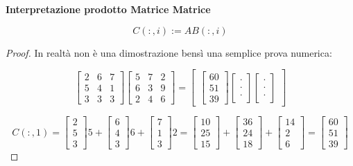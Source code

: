 \begin{thrm}{\textbf{Interpretazione prodotto Matrice Matrice}}

\[
	C(:,i) := AB(:,i)
\]

\end{thrm}

\begin{proof}

In realtà non è una dimostrazione bensì una semplice prova numerica:

\[
	\begin{bmatrix}2&6&7\\5&4&1\\3&3&3\end{bmatrix}\begin{bmatrix}5&7&2\\6&3&9\\2&4&6\end{bmatrix} = \begin{bmatrix}\begin{bmatrix}60\\51\\39\end{bmatrix}\begin{bmatrix}\mathord{\cdot}\\\mathord{\cdot}\\\mathord{\cdot}\end{bmatrix}\begin{bmatrix}\mathord{\cdot}\\\mathord{\cdot}\\\mathord{\cdot}\end{bmatrix}\end{bmatrix}
\]

\[
	C(:,1) = \begin{bmatrix}2\\5\\3\end{bmatrix}5+\begin{bmatrix}6\\4\\3\end{bmatrix}6 + \begin{bmatrix}7\\1\\3\end{bmatrix}2 = \begin{bmatrix}10\\25\\15\end{bmatrix} + \begin{bmatrix}36\\24\\18\end{bmatrix} + \begin{bmatrix}14\\2\\6\end{bmatrix} = \begin{bmatrix}60\\51\\39\end{bmatrix}
\]

\end{proof}

